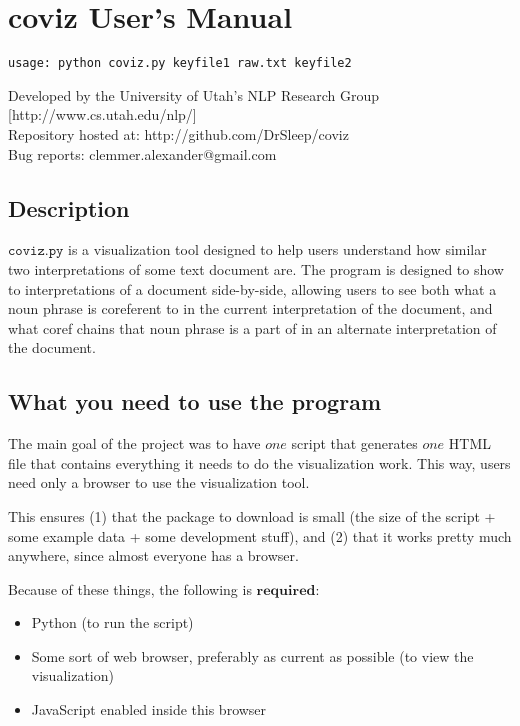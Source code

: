 \documentclass[a4paper]{article}
\begin{document}
\section*{coviz User's Manual}
\begin{verbatim}
usage: python coviz.py keyfile1 raw.txt keyfile2
\end{verbatim}

\noindent Developed by the University of Utah's NLP Research Group [http://www.cs.utah.edu/nlp/] \\
\noindent Repository hosted at: http://github.com/DrSleep/coviz \\
\noindent Bug reports: clemmer.alexander@gmail.com

\subsection*{Description}
$\texttt{coviz.py}$ is a visualization tool designed to help users understand how similar two interpretations of some text document are. The program is designed to show to interpretations of a document side-by-side, allowing users to see both what a noun phrase is coreferent to in the current interpretation of the document, and what coref chains that noun phrase is a part of in an alternate interpretation of the document.

\subsection*{What you need to use the program}

The main goal of the project was to have $\textit{one}$ script that generates $\textit{one}$ HTML file that contains everything it needs to do the visualization work. This way, users need only a browser to use the visualization tool.

This ensures (1) that the package to download is small (the size of the script + some example data + some development stuff), and (2) that it works pretty much anywhere, since almost everyone has a browser.

Because of these things, the following is $\textbf{required}$:

\begin{itemize}
\item Python (to run the script)
\item Some sort of web browser, preferably as current as possible (to view the visualization)
\item JavaScript enabled inside this browser
\end{itemize}
\end{document}
